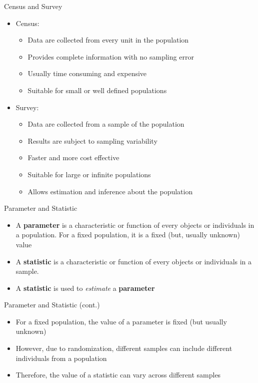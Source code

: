 \documentclass[12pt, aspectratio=169]{beamer}
\begin{document}
	\begin{frame}{Census and Survey}
		\begin{itemize}
		\item Census:
			\begin{itemize}
				\item Data are collected from every unit in the population
				\item Provides complete information with no sampling error
				\item Usually time consuming and expensive
				\item Suitable for small or well defined populations
			\end{itemize}
			\item Survey:
			\begin{itemize}
				\item Data are collected from a sample of the population
				\item Results are subject to sampling variability
				\item Faster and more cost effective
				\item Suitable for large or infinite populations
				\item Allows estimation and inference about the population
			\end{itemize}
		\end{itemize}
	\end{frame}


	\begin{frame}{Parameter and Statistic}
		\begin{itemize}
			\item A \textbf{parameter} is a characteristic or function of every objects or individuals in a population. For a fixed population, it is a fixed (but, usually unknown) value
			\item A \textbf{statistic} is a characteristic or function of every objects or individuals in a sample.
			\item A \textbf{statistic} is used to \textit{estimate} a \textbf{parameter}
		\end{itemize}
	\end{frame}


	\begin{frame}{Parameter and Statistic (cont.)}
		\begin{itemize}
			\item For a fixed population, the value of a parameter is fixed (but usually unknown)
			\item However, due to randomization, different samples can include different individuals from a population
			\item Therefore, the value of a statistic can vary across different samples
		\end{itemize}
	\end{frame}
\end{document}
